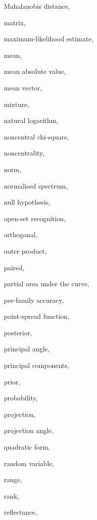 \documentclass[11pt,a4paper,oneside,openany]{book}
\begin{document}
\begin{theindex}
  \indexspace
  \item Mahalanobis distance, 
  \item matrix, 
  \item maximum-likelihood estimate, 
  \item mean, 
  \item mean absolute value, 
  \item mean vector, 
  \item mixture, 
  \indexspace
  \item natural logarithm, 
  \item noncentral chi-square, 
  \item noncentrality, 
  \item norm, 
  \item normalised spectrum, 
  \item null hypothesis, 
  \indexspace
  \item open-set recognition, 
  \item orthogonal, 
  \item outer product, 
  \indexspace
  \item paired, 
  \item partial area under the curve, 
  \item per-family accuracy, 
  \item point-spread function, 
  \item posterior, 
  \item principal angle, 
  \item principal components, 
  \item prior, 
  \item probability, 
  \item projection, 
  \item projection angle, 
  \indexspace
  \item quadratic form, 
  \indexspace
  \item random variable, 
  \item range, 
  \item rank, 
  \item reflectance, 

\end{theindex}
\end{document}
